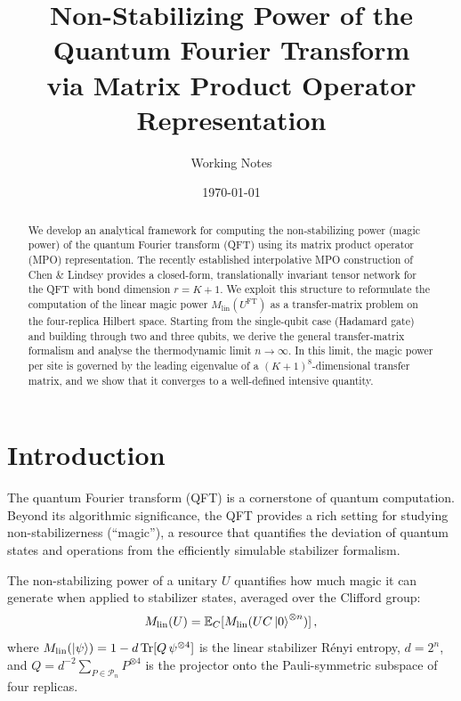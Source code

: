\documentclass[11pt,a4paper]{article}
\theoremstyle{definition}
\theoremstyle{remark}
\newcommand{\PP}{\mathcal{P}}
\newcommand{\Mlin}{M_{\mathrm{lin}}}
\newcommand{\UFT}{U^{\mathrm{FT}}}
\renewcommand{\Tr}{\mathrm{Tr}}
\begin{document}
\title{\textbf{Non-Stabilizing Power of the Quantum Fourier Transform\\[4pt]
via Matrix Product Operator Representation}}
\author{Working Notes}
\date{\today}
\maketitle

\begin{abstract}
We develop an analytical framework for computing the non-stabilizing power (magic power) of the quantum Fourier transform (QFT) using its matrix product operator (MPO) representation.
The recently established interpolative MPO construction of Chen \& Lindsey provides a closed-form, translationally invariant tensor network for the QFT with bond dimension $r=K+1$.
We exploit this structure to reformulate the computation of the linear magic power $\Mlin(\UFT)$ as a transfer-matrix problem on the four-replica Hilbert space.
Starting from the single-qubit case (Hadamard gate) and building through two and three qubits, we derive the general transfer-matrix formalism and analyse the thermodynamic limit $n\to\infty$.
In this limit, the magic power per site is governed by the leading eigenvalue of a $(K+1)^8$-dimensional transfer matrix, and we show that it converges to a well-defined intensive quantity.
\end{abstract}

\tableofcontents
\newpage

\section{Introduction}
\label{sec:intro}

The quantum Fourier transform (QFT) is a cornerstone of quantum computation.
Beyond its algorithmic significance, the QFT provides a rich setting for studying non-stabilizerness (``magic''), a resource that quantifies the deviation of quantum states and operations from the efficiently simulable stabilizer formalism.

The non-stabilizing power of a unitary $U$ quantifies how much magic it can generate when applied to stabilizer states, averaged over the Clifford group:
\begin{equation}\label{eq:magic_power_def}
  \Mlin(U) = \mathbb{E}_{C}[\Mlin(UC\ket{0}^{\otimes n})]\,,
\end{equation}
where $\Mlin(\ket{\psi}) = 1 - d\,\Tr[Q\,\psi^{\otimes 4}]$ is the linear stabilizer R\'enyi entropy, $d=2^n$, and $Q = d^{-2}\sum_{P\in\PP_n} P^{\otimes 4}$ is the projector onto the Pauli-symmetric subspace of four replicas.
\end{document}
